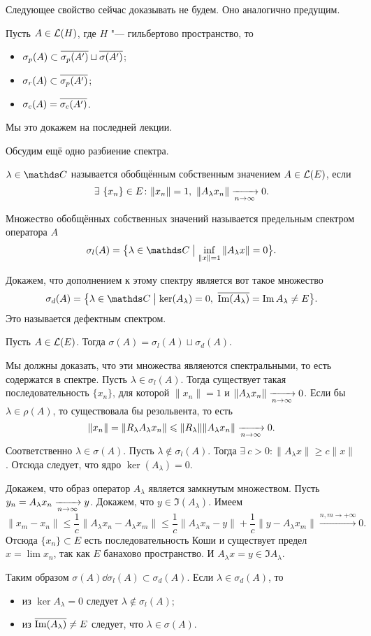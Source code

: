 Следующее свойство сейчас доказывать не будем. Оно аналогично предущим.
\begin{Ut}
  Пусть $A\in\mathcal L(H)$, где $H$ "--- гильбертово пространство, то 
\begin{itemize}
\item $\sigma_p(A)\subset\overline{\sigma_p(A')}\sqcup\overline{\sigma(A')}$;
\item $\sigma_r(A)\subset\overline{\sigma_p(A')}$;
\item $\sigma_c(A) = \overline{\sigma_c(A')}$.
\end{itemize}
\end{Ut}
Мы это докажем на последней лекции.

Обсудим ещё одно разбиение спектра.
\begin{Def}
  $\lambda\in \C$ называется обобщённым собственным значением $A\in\mathcal L(E)$, если
\[
  \exists\ \{x_n\}\in E\colon \|x_n\|=1,\ \|A_\lambda x_n\|\te 0.
\]

Множество обобщённых собственных значений называется  предельным спектром оператора $A$
\[
  \sigma_l(A) = \big\{\lambda\in\C\bigm|\inf\limits_{\|x\|=1}\|A_\lambda x\| = 0\big\}.
\]
\end{Def}

Докажем, что дополнением к этому спектру является вот такое множество
\[
  \sigma_d(A) = \big\{\lambda\in\C\bigm| \ker(A_\lambda) = 0,\ \ol{\Im(A_\lambda)} = \Im A_\lambda\ne E\big\}.
\]
Это называется дефектным спектром.

\begin{Ut}
  Пусть $A\in\mathcal L(E)$. Тогда $\sigma(A) = \sigma_l(A)\sqcup \sigma_d(A)$.
\end{Ut}
\begin{Proof}
Мы должны доказать, что эти множества являеются спектральными, то есть содержатся в спектре. Пусть $\lambda\in \sigma_l(A)$. Тогда существует такая последовательность $\{x_n\}$, для которой $\|x_n\|=1$ и $\|A_\lambda x_n\|\xrightarrow[n\rightarrow\infty]{} 0$. Если бы $\lambda\in\rho(A)$, то существовала бы резольвента, то есть
\[
  \|x_n\| = \|R_\lambda A_\lambda x_n\|\leqslant 
  \|R_\lambda\| \|A_\lambda x_n\|\xrightarrow[n\rightarrow\infty]{} 0.
\]
Соответственно $\lambda\in \sigma(A)$.
Пусть $\lambda\not\in \sigma_l(A)$. Тогда $\exists\ c>0\colon \|A_\lambda x\|\ge c\|x\|$. Отсюда следует, что ядро $\ker(A_\lambda)=0$.

Докажем, что образ оператор $A_\lambda$ является замкнутым множеством. Пусть $y_n = A_\lambda x_n\xrightarrow[n\rightarrow\infty]{} y$. Докажем, что $y\in\Im(A_\lambda)$. Имеем
\[
  \|x_m-x_n\|\le \frac1c\|A_\lambda x_n- A_\lambda x_m\|\le 
  \frac1c\|A_\lambda x_n - y\| + \frac1c\|y - A_\lambda x_m\|\xrightarrow{n,m\to+\infty}0.
\]
Отсюда $\{x_n\}\subset E$ есть последовательность Коши и существует предел $x = \lim x_n$, так как $E$ банахово пространство. И $A_\lambda x = y\in \Im A_\lambda$.

Таким образом $\sigma(A)\dd \sigma_l(A)\subset \sigma_d(A)$. Если $\lambda\in \sigma_d(A)$, то 
\begin{itemize}
\item из $\ker A_\lambda=0$ следует $\lambda\not\in \sigma_l(A)$;
\item из $\overline{\mathop{\mathrm{Im}}(A_\lambda)}\ne E$ следует, что $\lambda\in\sigma(A)$.
\end{itemize}
\end{Proof}

